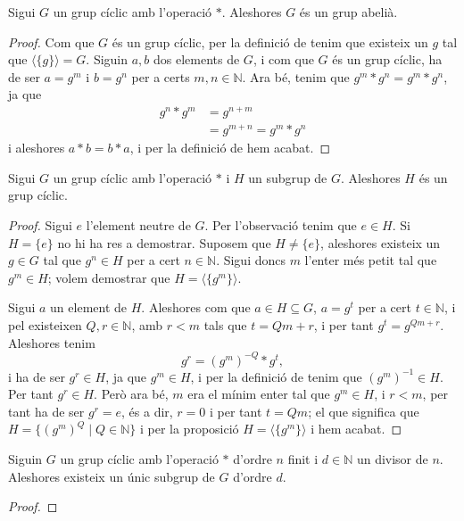 \documentclass[../Apunts.tex]{subfiles}
\begin{document}
	\begin{proposition}
		Sigui \(G\) un grup cíclic amb l'operació \(\ast\). Aleshores \(G\) és un grup abelià.
		\begin{proof}
			Com que \(G\) és un grup cíclic, per la definició de  tenim que existeix un \(g\) tal que \(\langle\{g\}\rangle=G\). Siguin \(a,b\) dos  elements de \(G\), i com que \(G\) és un grup cíclic, ha de ser \(a=g^{m}\) i \(b=g^{n}\) per a certs \(m,n\in\mathbb{N}\). Ara bé, tenim que \(g^{m}\ast g^{n}=g^{m}\ast g^{n}\), ja que
			\begin{align*}
			g^{n}\ast g^{m}&=g^{n+m}\\
			&=g^{m+n}=g^{m}\ast g^{n}
			\end{align*}
			i aleshores \(a\ast b=b\ast a\), i per la definició de  hem acabat.
		\end{proof}
	\end{proposition}
	\begin{proposition}
		Sigui \(G\) un grup cíclic amb l'operació \(\ast\) i \(H\) un subgrup de \(G\). Aleshores \(H\) és un grup cíclic.
		\begin{proof}
			Sigui \(e\) l'element neutre de \(G\). Per l'observació  tenim que \(e\in H\). Si \(H=\{e\}\) no hi ha res a demostrar. Suposem que \(H\neq\{e\}\), aleshores existeix un \(g\in G\) tal que \(g^{n}\in H\) per a cert \(n\in\mathbb{N}\). Sigui doncs \(m\) l'enter més petit tal que \(g^{m}\in H\); volem demostrar que \(H=\langle\{g^{m}\}\rangle\).
			
			Sigui \(a\) un element de \(H\). Aleshores com que \(a\in H\subseteq G\), \(a=g^{t}\) per a cert \(t\in\mathbb{N}\), i pel  existeixen \(Q,r\in\mathbb{N}\), amb \(r<m\) tals que \(t=Qm+r\), i per tant \(g^{t}=g^{Qm+r}\). Aleshores tenim
			\[g^{r}=\left(g^{m}\right)^{-Q}\ast g^{t},\]
			i ha de ser \(g^{r}\in H\), ja que \(g^{m}\in H\), i per la definició de  tenim que \(\left(g^{m}\right)^{-1}\in H\). Per tant \(g^{r}\in H\). Però ara bé, \(m\) era el mínim enter tal que \(g^{m}\in H\), i \(r<m\), per tant ha de ser \(g^{r}=e\), és a dir, \(r=0\) i per tant \(t=Qm\); el que significa que \(H=\{\left(g^{m}\right)^{Q}\mid Q\in\mathbb{N}\}\) i per la proposició  \(H=\langle\{g^{m}\}\rangle\) i hem acabat.
		\end{proof}
	\end{proposition}
	\begin{proposition}
		\label{prop:existència de subgrups cíclics d'ordres divisors}
		Siguin \(G\) un grup cíclic amb l'operació \(\ast\) d'ordre \(n\) finit i \(d\in\mathbb{N}\) un divisor de \(n\). Aleshores existeix un únic subgrup de \(G\) d'ordre \(d\).
		\begin{proof}
		\end{proof}
	\end{proposition}
\end{document}
